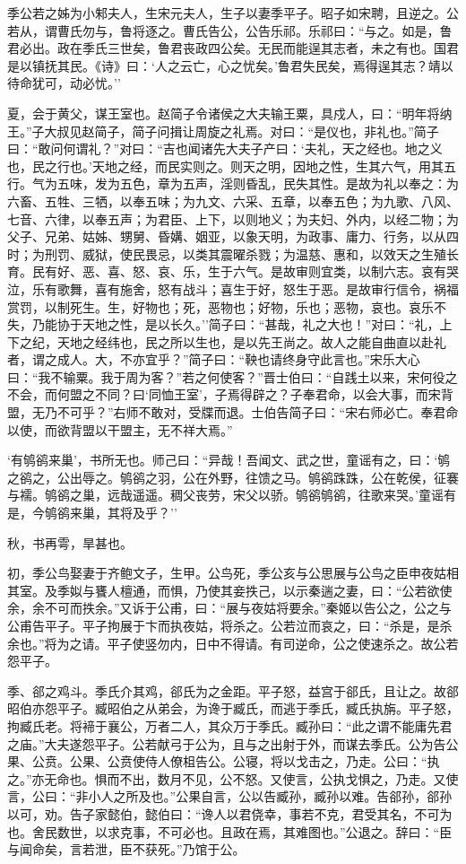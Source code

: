 \documentclass[]{article}
\begin{document}
季公若之姊为小邾夫人，生宋元夫人，生子以妻季平子。昭子如宋聘，且逆之。公若从，谓曹氏勿与，鲁将逐之。曹氏告公，公告乐祁。乐祁曰：``与之。如是，鲁君必出。政在季氏三世矣，鲁君丧政四公矣。无民而能逞其志者，未之有也。国君是以镇抚其民。《诗》曰：`人之云亡，心之忧矣。'鲁君失民矣，焉得逞其志？靖以待命犹可，动必忧。''

夏，会于黄父，谋王室也。赵简子令诸侯之大夫输王粟，具戍人，曰：``明年将纳王。''子大叔见赵简子，简子问揖让周旋之礼焉。对曰：``是仪也，非礼也。''简子曰：``敢问何谓礼？''对曰：``吉也闻诸先大夫子产曰：`夫礼，天之经也。地之义也，民之行也。'天地之经，而民实则之。则天之明，因地之性，生其六气，用其五行。气为五味，发为五色，章为五声，淫则昏乱，民失其性。是故为礼以奉之：为六畜、五牲、三牺，以奉五味；为九文、六采、五章，以奉五色；为九歌、八风、七音、六律，以奉五声；为君臣、上下，以则地义；为夫妇、外内，以经二物；为父子、兄弟、姑姊、甥舅、昏媾、姻亚，以象天明，为政事、庸力、行务，以从四时；为刑罚、威狱，使民畏忌，以类其震曜杀戮；为温慈、惠和，以效天之生殖长育。民有好、恶、喜、怒、哀、乐，生于六气。是故审则宜类，以制六志。哀有哭泣，乐有歌舞，喜有施舍，怒有战斗；喜生于好，怒生于恶。是故审行信令，祸福赏罚，以制死生。生，好物也；死，恶物也；好物，乐也；恶物，哀也。哀乐不失，乃能协于天地之性，是以长久。''简子曰：``甚哉，礼之大也！''对曰：``礼，上下之纪，天地之经纬也，民之所以生也，是以先王尚之。故人之能自曲直以赴礼者，谓之成人。大，不亦宜乎？''简子曰：``鞅也请终身守此言也。''宋乐大心曰：``我不输粟。我于周为客？''若之何使客？''晋士伯曰：``自践土以来，宋何役之不会，而何盟之不同？曰`同恤王室'，子焉得辟之？子奉君命，以会大事，而宋背盟，无乃不可乎？''右师不敢对，受牒而退。士伯告简子曰：``宋右师必亡。奉君命以使，而欲背盟以干盟主，无不祥大焉。''

`有鸲鹆来巢'，书所无也。师己曰：``异哉！吾闻文、武之世，童谣有之，曰：`鸲之鹆之，公出辱之。鸲鹆之羽，公在外野，往馈之马。鸲鹆跦跦，公在乾侯，征褰与襦。鸲鹆之巢，远哉遥遥。稠父丧劳，宋父以骄。鸲鹆鸲鹆，往歌来哭。'童谣有是，今鸲鹆来巢，其将及乎？''

秋，书再雩，旱甚也。

初，季公鸟娶妻于齐鲍文子，生甲。公鸟死，季公亥与公思展与公鸟之臣申夜姑相其室。及季姒与饔人檀通，而惧，乃使其妾抶己，以示秦遄之妻，曰：``公若欲使余，余不可而抶余。''又诉于公甫，曰：``展与夜姑将要余。''秦姬以告公之，公之与公甫告平子。平子拘展于卞而执夜姑，将杀之。公若泣而哀之，曰：``杀是，是杀余也。''将为之请。平子使竖勿内，日中不得请。有司逆命，公之使速杀之。故公若怨平子。

季、郤之鸡斗。季氏介其鸡，郤氏为之金距。平子怒，益宫于郤氏，且让之。故郤昭伯亦怨平子。臧昭伯之从弟会，为谗于臧氏，而逃于季氏，臧氏执旃。平子怒，拘臧氏老。将褅于襄公，万者二人，其众万于季氏。臧孙曰：``此之谓不能庸先君之庙。''大夫遂怨平子。公若献弓于公为，且与之出射于外，而谋去季氏。公为告公果、公贲。公果、公贲使侍人僚柤告公。公寝，将以戈击之，乃走。公曰：``执之。''亦无命也。惧而不出，数月不见，公不怒。又使言，公执戈惧之，乃走。又使言，公曰：``非小人之所及也。''公果自言，公以告臧孙，臧孙以难。告郤孙，郤孙以可，劝。告子家懿伯，懿伯曰：``谗人以君侥幸，事若不克，君受其名，不可为也。舍民数世，以求克事，不可必也。且政在焉，其难图也。''公退之。辞曰：``臣与闻命矣，言若泄，臣不获死。''乃馆于公。
\end{document}

